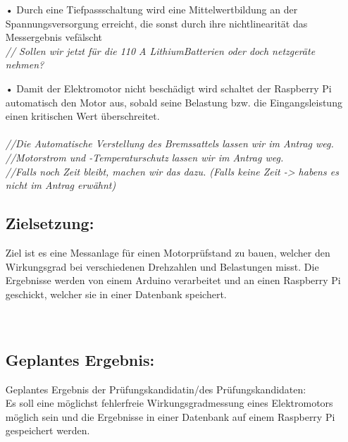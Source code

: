 \documentclass[12pt]{article}
\begin{document}
\begin{itemize}
\item[•] Durch eine Tiefpassschaltung wird eine Mittelwertbildung an der Spannungsversorgung erreicht, die sonst durch ihre nichtlinearität das Messergebnis vefälscht\\

\textit{// Sollen wir jetzt für die 110 A  LithiumBatterien oder doch netzgeräte nehmen?}\\

\item[•]Damit der Elektromotor nicht beschädigt wird schaltet der Raspberry Pi automatisch den Motor aus, sobald seine Belastung bzw. die Eingangsleistung einen kritischen Wert überschreitet.\\\\         %

\textit{//Die Automatische Verstellung des Bremssattels lassen wir im Antrag weg.\\
//Motorstrom und -Temperaturschutz lassen wir im Antrag weg.\\ 
//Falls noch Zeit bleibt, machen wir das dazu. (Falls keine Zeit -> habens es nicht im Antrag erwähnt)\\}


\newpage
\subsection*{Zielsetzung:}
Ziel ist es eine Messanlage für einen Motorprüfstand zu bauen, welcher den Wirkungsgrad 
bei verschiedenen Drehzahlen und Belastungen misst. Die Ergebnisse werden von einem Arduino 
verarbeitet und an einen Raspberry Pi geschickt, welcher sie in einer Datenbank speichert.\\\\\\



\subsection*{Geplantes Ergebnis:}
Geplantes Ergebnis der Prüfungskandidatin/des Prüfungskandidaten:\\
Es soll eine möglichst fehlerfreie Wirkungsgradmessung eines Elektromotors möglich sein und die 
Ergebnisse in einer Datenbank auf einem Raspberry Pi gespeichert werden.\\\\



\end{itemize}
\end{document}
